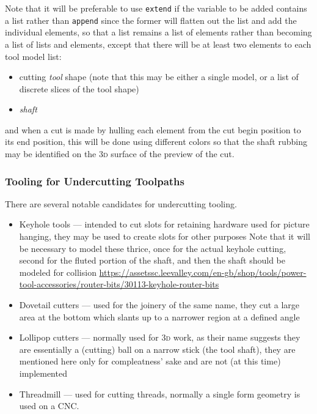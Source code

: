 \documentclass{ltxdoc}
\begin{document}
Note that it will be preferable to use \verb|extend| if the variable to be added contains a list rather than \verb|append| since the former will flatten out the list and add the individual elements, so that a list remains a list of elements rather than becoming a list of lists and elements, except that there will be at least two elements to each tool model list:

\begin{itemize}
\item cutting \emph{tool} shape (note that this may be either a single model, or a list of discrete slices of the tool shape)
\item \emph{shaft}
\end{itemize}

\noindent and when a cut is made by hulling each element from the cut begin position to its end position, this will be done using different colors so that the shaft rubbing may be identified on the \textsc{3d} surface of the preview of the cut.

\subsubsection{Tooling for Undercutting Toolpaths}

There are several notable candidates for under\-cutting tooling. \label{para:undercuttooling} 

\begin{itemize}
\item Keyhole tools --- intended to cut slots for retaining hardware used for picture
                        hanging, they may be used to create slots for other purposes
                        Note that it will be necessary to model these thrice, once for
                        the actual keyhole cutting, second for the fluted portion of
                        the shaft, and then the shaft should be modeled for collision
                        \url{https://assetssc.leevalley.com/en-gb/shop/tools/power-tool-accessories/router-bits/30113-keyhole-router-bits} 
\item Dovetail cutters --- used for the joinery of the same name, they cut a large
                           area at the bottom which slants up to a narrower region
                           at a defined angle
\item Lollipop cutters --- normally used for \textsc{3d} work, as their name suggests
                           they are essentially a (cutting) ball on a narrow stick
                           (the tool shaft), they are mentioned here only for
                           compleatness' sake and are not (at this time) implemented
\item Threadmill --- used for cutting threads, normally a single form geometry is
                     used on a CNC.
\end{itemize}
\end{document}
